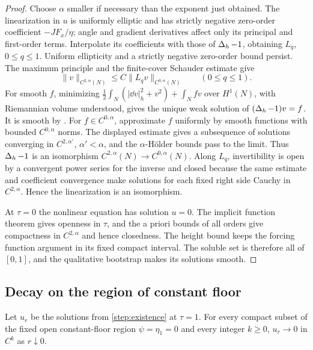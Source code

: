 \begin{proof}
Choose $\alpha$ smaller if necessary than the exponent just obtained.
The linearization in $u$ is uniformly elliptic and has strictly negative
zero-order coefficient $-JF_x/\eta$; angle and gradient derivatives
affect only its principal and first-order terms. Interpolate its
coefficients with those of $\operatorname{\Delta}_h-1$, obtaining $L_q$, $0\le q\le1$.
Uniform ellipticity and a strictly negative zero-order bound persist.
The maximum principle and the finite-cover Schauder estimate
\citep[Lecture~12, Theorem~2]{simonPDE} give
\[
 \|v\|_{C^{2,\alpha}(N)}
 \le C\|L_qv\|_{C^{0,\alpha}(N)}\qquad(0\le q\le1).
\]
For smooth $f$, minimizing
$\frac12\int_N(|\dd v|_h^2+v^2)+\int_Nfv$ over $H^1(N)$, with
Riemannian volume understood, gives the unique weak solution of
$(\operatorname{\Delta}_h-1)v=f$. It is smooth by
\citet[Lecture~6, Theorem~1 and Corollary~1]{simonPDE}.
For $f\in C^{0,\alpha}$, approximate $f$ uniformly by smooth functions
with bounded $C^{0,\alpha}$ norms. The displayed estimate gives a
subsequence of solutions converging in $C^{2,\alpha'}$, $\alpha'<\alpha$,
and the $\alpha$-H\"older bounds pass to the limit. Thus $\operatorname{\Delta}_h-1$ is
an isomorphism $C^{2,\alpha}(N)\to C^{0,\alpha}(N)$.
Along $L_q$, invertibility is open by a convergent power series for the inverse and closed
because the same estimate and coefficient convergence make solutions
for each fixed right side Cauchy in $C^{2,\alpha}$. Hence the
linearization is an isomorphism.

At $\tau=0$ the nonlinear equation has solution $u=0$. The implicit
function theorem gives openness in $\tau$, and the a priori bounds of
all orders give compactness in $C^{2,\alpha}$ and hence closedness.
The height bound keeps the forcing function argument in its fixed compact
interval. The soluble set is therefore all of $[0,1]$, and the
qualitative bootstrap makes its solutions smooth.
\end{proof}

\subsection{Decay on the region of constant floor}

\begin{lemma}[Locality]\label{step:locality}
Let $u_r$ be the solutions from \cref{step:existence} at $\tau=1$.
For every compact subset of the fixed open constant-floor region
$\psi=\eta_1=0$ and every integer $k\ge0$, $u_r\to0$ in $C^k$
as $r\downarrow0$.
\end{lemma}

